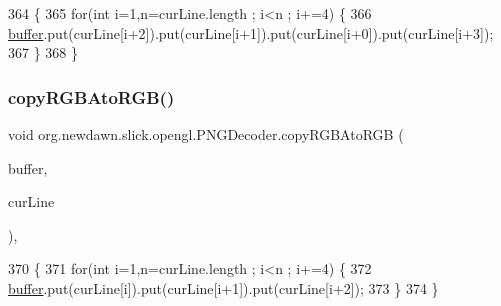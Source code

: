 \begin{DoxyCode}
364                                                                    \{
365         \textcolor{keywordflow}{for}(\textcolor{keywordtype}{int} i=1,n=curLine.length ; i<n ; i+=4) \{
366             \mbox{\hyperlink{classorg_1_1newdawn_1_1slick_1_1opengl_1_1_p_n_g_decoder_ae205f9222586a2bc01a8a240c5c210ad}{buffer}}.put(curLine[i+2]).put(curLine[i+1]).put(curLine[i+0]).put(curLine[i+3]);
367         \}
368     \}
\end{DoxyCode}
\mbox{\label{classorg_1_1newdawn_1_1slick_1_1opengl_1_1_p_n_g_decoder_a131a42f31d463259fae5359856d0b251}} 
\subsubsection{\texorpdfstring{copy\+R\+G\+B\+Ato\+R\+G\+B()}{copyRGBAtoRGB()}}
{\footnotesize\ttfamily void org.\+newdawn.\+slick.\+opengl.\+P\+N\+G\+Decoder.\+copy\+R\+G\+B\+Ato\+R\+GB (\begin{DoxyParamCaption}\item[{Byte\+Buffer}]{buffer,  }\item[{byte \mbox{[}$\,$\mbox{]}}]{cur\+Line }\end{DoxyParamCaption})\hspace{0.3cm}{\ttfamily [inline]}, {\ttfamily [private]}}


\begin{DoxyCode}
370                                                                   \{
371         \textcolor{keywordflow}{for}(\textcolor{keywordtype}{int} i=1,n=curLine.length ; i<n ; i+=4) \{
372             \mbox{\hyperlink{classorg_1_1newdawn_1_1slick_1_1opengl_1_1_p_n_g_decoder_ae205f9222586a2bc01a8a240c5c210ad}{buffer}}.put(curLine[i]).put(curLine[i+1]).put(curLine[i+2]);
373         \}
374     \}
\end{DoxyCode}
\mbox{\label{classorg_1_1newdawn_1_1slick_1_1opengl_1_1_p_n_g_decoder_a749e57099e563da4f6508a337825adaa}} 
